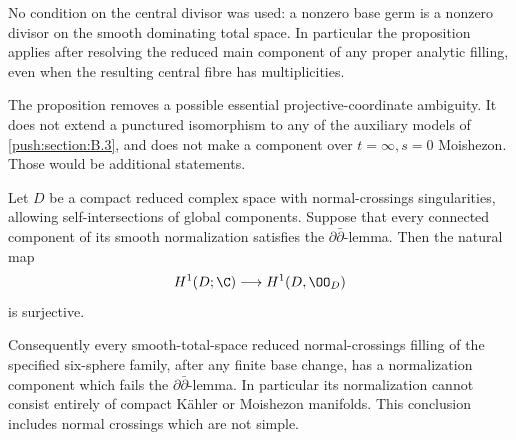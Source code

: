 No condition on the central divisor was used: a nonzero base
germ is a nonzero divisor on the smooth dominating total space.
In particular the proposition applies after resolving the
reduced main component of any proper analytic filling, even
when the resulting central fibre has multiplicities.

The proposition removes a possible essential projective-coordinate
ambiguity. It does not extend a punctured isomorphism to any of
the auxiliary models of \ref{push:section:B.3}, and does not make a component over
$t=\infty,s=0$ Moishezon. Those would be additional statements.

\begin{theorem}\label{push:src:B.4.5}

Let $D$ be a compact reduced complex space with normal-crossings
singularities, allowing self-intersections of global components.
Suppose that every connected component of its smooth normalization
satisfies the $\partial\bar\partial$-lemma. Then the natural map
\[
 H^1(D;\C)\longrightarrow H^1(D,\OO_D)
\]
is surjective.

Consequently every smooth-total-space reduced normal-crossings
filling of the specified six-sphere family, after any finite base
change, has a normalization component which fails the
$\partial\bar\partial$-lemma. In particular its normalization
cannot consist entirely of compact K\"ahler or Moishezon manifolds.
This conclusion includes normal crossings which are not simple.
\end{theorem}


